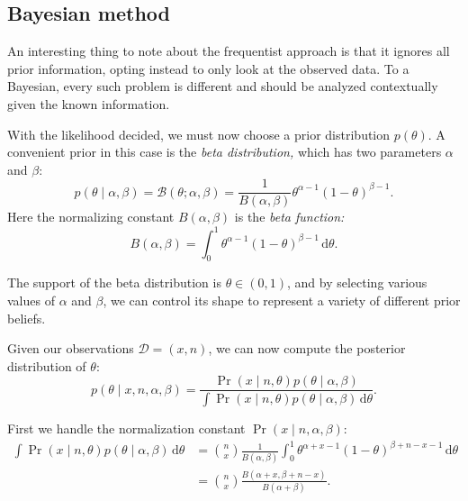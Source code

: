 \documentclass{article}
\newcommand{\given}{\mid}
\newcommand{\mc}[1]{\mathcal{#1}}
\newcommand{\data}{\mc{D}}
\newcommand{\intd}[1]{\,\mathrm{d}{#1}}
\begin{document}
\subsection*{Bayesian method}

An interesting thing to note about the frequentist approach is that it
ignores all prior information, opting instead to only look at the
observed data.  To a Bayesian, every such problem is different and
should be analyzed contextually given the known information.

With the likelihood decided, we must now choose a prior distribution
$p(\theta)$.  A convenient prior in this case is the \emph{beta
  distribution,} which has two parameters $\alpha$ and $\beta$:
\begin{equation*}
  p(\theta \given \alpha, \beta)
  =
  \mc{B}(\theta; \alpha, \beta)
  =
  \frac{1}{B(\alpha, \beta)}
  \theta^{\alpha - 1}(1 - \theta)^{\beta - 1}.
\end{equation*}
Here the normalizing constant $B(\alpha, \beta)$ is the \emph{beta
  function:}
\begin{equation*}
  B(\alpha, \beta)
  =
  \int_{0}^{1} \theta^{\alpha - 1}(1 - \theta)^{\beta - 1} \intd{\theta}.
\end{equation*}

The support of the beta distribution is $\theta \in (0, 1)$, and by
selecting various values of $\alpha$ and $\beta$, we can control its
shape to represent a variety of different prior beliefs.

Given our observations $\data = (x, n)$, we can now compute the
posterior distribution of $\theta$:
\begin{equation*}
  p(\theta \given x, n, \alpha, \beta)
  =
  \frac
      {     \Pr(x \given n, \theta) p(\theta \given \alpha, \beta)}
      {\int \Pr(x \given n, \theta) p(\theta \given \alpha, \beta) \intd{\theta}}.
\end{equation*}

First we handle the normalization constant $\Pr(x \given n, \alpha, \beta)$:
\begin{align*}
  \int \Pr(x \given n, \theta) p(\theta \given \alpha, \beta) \intd{\theta}
  &=
  \binom{n}{x}
  \frac{1}{B(\alpha, \beta)}
  \int_{0}^{1}
  \theta^{\alpha + x - 1}(1 - \theta)^{\beta + n - x - 1} \intd{\theta}
  \\
  &=
  \binom{n}{x}
  \frac{B(\alpha + x, \beta + n - x)}{B(\alpha + \beta)}.
\end{align*}
\end{document}
